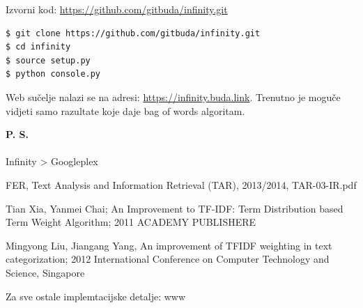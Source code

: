 \documentclass[a4paper,12pt]{article}
\begin{document}
Izvorni kod: \url{https://github.com/gitbuda/infinity.git}

\begin{lstlisting}[language=bash]
$ git clone https://github.com/gitbuda/infinity.git
$ cd infinity
$ source setup.py
$ python console.py
\end{lstlisting}

Web sučelje nalazi se na adresi: \url{https://infinity.buda.link}. Trenutno je moguče vidjeti samo razultate koje daje bag of words algoritam.

\vspace{0.3cm}

\textbf{P. S.}\\
\\
Infinity > Googleplex

\medskip
 
\begin{thebibliography}{9}

FER, Text Analysis and Information Retrieval (TAR), 2013/2014, TAR-03-IR.pdf

Tian Xia, Yanmei Chai; An Improvement to TF-IDF: Term Distribution based Term Weight Algorithm; 2011 ACADEMY PUBLISHERE

Mingyong Liu, Jiangang Yang, An improvement of TFIDF weighting in text categorization; 2012 International Conference on Computer Technology and Science, Singapore

Za sve ostale implemtacijske detalje: www

\end{thebibliography}
\end{document}
